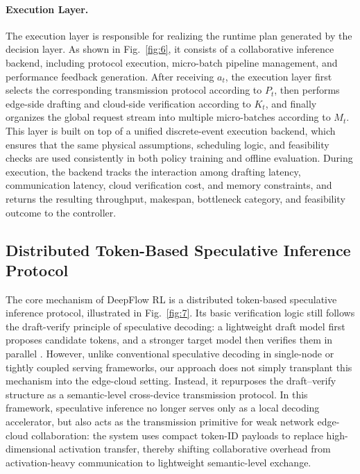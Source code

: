 \documentclass[a4paper,fleqn]{cas-dc}
\begin{document}
\paragraph{Execution Layer.}
The execution layer is responsible for realizing the runtime plan generated by the decision layer. As shown in Fig.~\ref{fig:6}, it consists of a collaborative inference backend, including protocol execution, micro-batch pipeline management, and performance feedback generation. After receiving $a_t$, the execution layer first selects the corresponding transmission protocol according to $P_t$, then performs edge-side drafting and cloud-side verification according to $K_t$, and finally organizes the global request stream into multiple micro-batches according to $M_t$. This layer is built on top of a unified discrete-event execution backend, which ensures that the same physical assumptions, scheduling logic, and feasibility checks are used consistently in both policy training and offline evaluation. During execution, the backend tracks the interaction among drafting latency, communication latency, cloud verification cost, and memory constraints, and returns the resulting throughput, makespan, bottleneck category, and feasibility outcome to the controller. 

\subsection{Distributed Token-Based Speculative Inference Protocol}

The core mechanism of DeepFlow RL is a distributed token-based speculative inference protocol, illustrated in Fig.~\ref{fig:7}. Its basic verification logic still follows the draft-verify principle of speculative decoding: a lightweight draft model first proposes candidate tokens, and a stronger target model then verifies them in parallel \cite{leviathan2023speculative,li2024eagle,miao2024specinfer}. However, unlike conventional speculative decoding in single-node or tightly coupled serving frameworks, our approach does not simply transplant this mechanism into the edge-cloud setting. Instead, it repurposes the draft--verify structure as a semantic-level cross-device transmission protocol. In this framework, speculative inference no longer serves only as a local decoding accelerator, but also acts as the transmission primitive for weak network edge-cloud collaboration: the system uses compact token-ID payloads to replace high-dimensional activation transfer, thereby shifting collaborative overhead from activation-heavy communication to lightweight semantic-level exchange.
\end{document}
